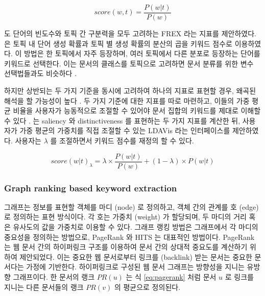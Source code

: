 \documentclass[11pt]{article}
\begin{document}
\begin{equation}
  \label{eq:topic_pmi}
  score(w,t) = \frac{P(w \vert t)}{P(w)}
\end{equation}

\citep{bischof2012summarizing} 도 단어의 빈도수와 토픽 간 구분력을 모두 고려하는 FREX 라는 지표를 제안하였다.
\citep{song2009topic} 은 토픽 내 단어 생성 확률과 토픽 별 생성 확률의 분산의 곱을 키워드 점수로 이용하였다.
이 방법은 한 토픽에서 자주 등장하며, 여러 토픽에서 다른 분포로 등장하는 단어를 키워드로 선택한다.
이는 문서의 클래스를 토픽으로 고려하면 문서 분류를 위한 변수 선택법들과도 비슷하다 \citep{largeron2011entropy, popescul2000automatic}.

하지만 상반되는 두 가지 기준을 동시에 고려하여 하나의 지표로 표현할 경우, 왜곡된 해석을 할 가능성이 높다 \citep{chuang2012interpretation}. 
두 가지 기준에 대한 지표를 따로 마련하고, 이들의 가중 평균 비율을 사용자가 능동적으로 조절할 수 있어야 문서 집합의 키워드를 제대로 이해할 수 있다 \citep{chuang2012interpretation}.
\citep{sievert2014ldavis}는 saliency 와 distinctiveness 를 표현하는 두 가지 지표를 계산한 뒤, 사용자가 가중 평균의 가중치를 직접 조절할 수 있는 LDAVis 라는 인터페이스를 제안하였다.
사용자는 $\lambda$ 를 조절하면서 키워드 점수를 재정의 할 수 있다.

\begin{equation}
  \label{eq:ldavis}
  score(w \vert t)_\lambda = \lambda \times \frac{P(w \vert t)}{P(w)} + (1 - \lambda) \times P(w \vert t)
\end{equation}

\subsubsection{Graph ranking based keyword extraction}

그래프는 정보를 표현할 객체를 마디 (node) 로 정의하고, 객체 간의 관계를 호 (edge) 로 정의하는 표현 방식이다.
각 호는 가중치 (weight) 가 할당되며, 두 마디의 거리 혹은 유사도의 값을 가중치로 이용할 수 있다.
그래프 랭킹 방법은 그래프에서 각 마디의 중요성을 정의하는 방법으로, PageRank \citep{ilprints422}와 HITS \citep{kleinberg1999authoritative} 는 대표적인 방법이다.
PageRank 는 웹 문서 간의 하이퍼링크 구조를 이용하여 문서 간의 상대적 중요도를 계산하기 위하여 제안되었다.
이는 중요한 웹 문서로부터 링크를 (backlink) 받는 문서는 중요한 문서다는 가정에 기반한다.
하이퍼링크로 구성된 웹 문서 그래프는 방향성을 지니는 유방향 그래프이다.
한 문서의 랭크 $PR(u)$ 는 식 \ref{eq:pagerank} 처럼 문서 $u$ 로 링크를 지니는 다른 문서들의 랭크 $PR(v)$ 의 평균으로 정의된다.
\end{document}
